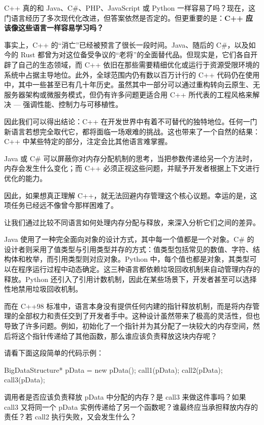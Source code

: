 C++ 真的和 Java、C\#、PHP、JavaScript 或 Python 一样容易了吗？现在，这门语言经历了多次现代化改进，但答案依然是否定的。但更重要的是：\textbf{C++ 应该像这些语言一样容易学习吗？}

事实上，C++ 的“消亡”已经被预言了很长一段时间。Java、随后的 C\#，以及如今的 Rust 都曾为对这位备受争议的“老将”的全面替代品。但现实是，它们各自开辟了自己的生态领域，而 C++ 依旧在那些需要精细优化或运行于资源受限环境的系统中占据主导地位。此外，全球范围内仍有数以百万计行的 C++ 代码仍在使用中，其中一些甚至已有几十年历史。虽然其中一部分可以通过重构转向云原生、无服务器架构或微服务模式，但仍有许多问题更适合用 C++ 所代表的工程风格来解决 --- 强调性能、控制力与可移植性。

因此我们可以得出结论：C++ 在开发世界中有着不可替代的独特地位。任何一门新语言若想完全取代它，都将面临一场艰难的挑战。这也带来了一个自然的结果：C++ 中某些特定的部分，注定会比其他语言难掌握。

Java 或 C\# 可以屏蔽你对内存分配机制的思考，当把参数传递给另一个方法时，内存会发生什么变化；而 C++ 必须正视这些问题，并赋予开发者根据上下文进行优化的能力。

因此，如果想真正理解 C++，就无法回避内存管理这个核心议题。幸运的是，这项任务已经远不像曾今那样困难了。

让我们通过比较不同语言如何处理内存分配与释放，来深入分析它们之间的差异。

Java 使用了一种完全面向对象的设计方式，其中每一个值都是一个对象。C\# 的设计者则采用了值类型与引用类型并存的方式：值类型包括常见的数值、字符、结构体和枚举，而引用类型则对应对象。Python 中，每个值也都是对象，其类型可以在程序运行过程中动态确定。这三种语言都依赖垃圾回收机制来自动管理内存的释放。Python 还引入了引用计数机制，因此在某些场景下，开发者甚至可以选择性地禁用垃圾回收机制。

而在 C++98 标准中，语言本身没有提供任何内建的指针释放机制，而是将内存管理的全部权力和责任交到了开发者手中。这种设计虽然带来了极高的灵活性，但也导致了许多问题。例如，初始化了一个指针并为其分配了一块较大的内存空间，然后将这个指针传递给了其他函数，那么谁应该负责释放这块内存呢？

请看下面这段简单的代码示例：

\begin{cpp}
BigDataStructure* pData = new pData();
call1(pData);
call2(pData);
call3(pData);
\end{cpp}

调用者是否应该负责释放 pData 中分配的内存？是 call3 来做这件事吗？如果 call3 又将同一个 pData 实例传递给了另一个函数呢？谁最终应当承担释放内存的责任？若 call2 执行失败，又会发生什么？

